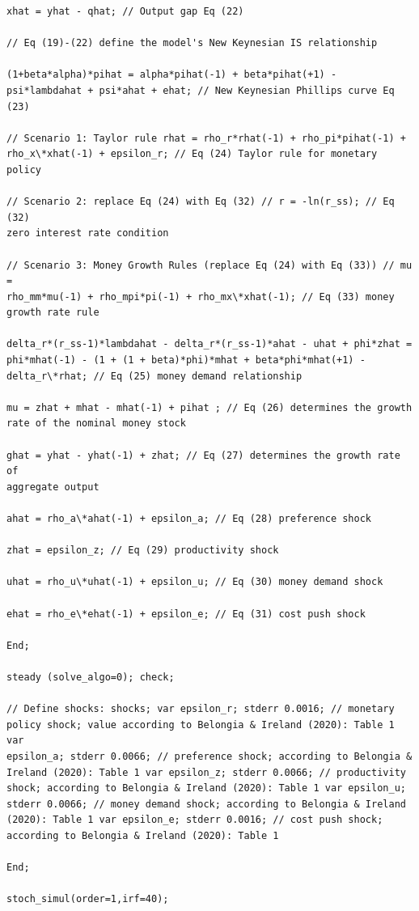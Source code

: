 \documentclass[11pt,preprint, authoryear]{elsarticle}
\numberwithin{equation}{section}
\numberwithin{figure}{section}
\numberwithin{table}{section}
\begin{document}
\begin{verbatim}
xhat = yhat - qhat; // Output gap Eq (22)

// Eq (19)-(22) define the model's New Keynesian IS relationship

(1+beta*alpha)*pihat = alpha*pihat(-1) + beta*pihat(+1) -
psi*lambdahat + psi*ahat + ehat; // New Keynesian Phillips curve Eq (23)

// Scenario 1: Taylor rule rhat = rho_r*rhat(-1) + rho_pi*pihat(-1) +
rho_x\*xhat(-1) + epsilon_r; // Eq (24) Taylor rule for monetary policy

// Scenario 2: replace Eq (24) with Eq (32) // r = -ln(r_ss); // Eq (32)
zero interest rate condition

// Scenario 3: Money Growth Rules (replace Eq (24) with Eq (33)) // mu =
rho_mm*mu(-1) + rho_mpi*pi(-1) + rho_mx\*xhat(-1); // Eq (33) money
growth rate rule

delta_r*(r_ss-1)*lambdahat - delta_r*(r_ss-1)*ahat - uhat + phi*zhat =
phi*mhat(-1) - (1 + (1 + beta)*phi)*mhat + beta*phi*mhat(+1) -
delta_r\*rhat; // Eq (25) money demand relationship

mu = zhat + mhat - mhat(-1) + pihat ; // Eq (26) determines the growth
rate of the nominal money stock

ghat = yhat - yhat(-1) + zhat; // Eq (27) determines the growth rate of
aggregate output

ahat = rho_a\*ahat(-1) + epsilon_a; // Eq (28) preference shock

zhat = epsilon_z; // Eq (29) productivity shock

uhat = rho_u\*uhat(-1) + epsilon_u; // Eq (30) money demand shock

ehat = rho_e\*ehat(-1) + epsilon_e; // Eq (31) cost push shock

End;

steady (solve_algo=0); check;

// Define shocks: shocks; var epsilon_r; stderr 0.0016; // monetary
policy shock; value according to Belongia & Ireland (2020): Table 1 var
epsilon_a; stderr 0.0066; // preference shock; according to Belongia &
Ireland (2020): Table 1 var epsilon_z; stderr 0.0066; // productivity
shock; according to Belongia & Ireland (2020): Table 1 var epsilon_u;
stderr 0.0066; // money demand shock; according to Belongia & Ireland
(2020): Table 1 var epsilon_e; stderr 0.0016; // cost push shock;
according to Belongia & Ireland (2020): Table 1

End;

stoch_simul(order=1,irf=40);
\end{verbatim}
\end{document}
